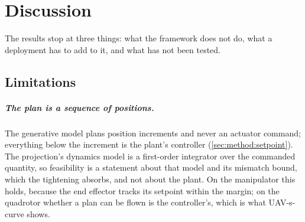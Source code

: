 
\chapter{Discussion}\label{ch:discussion}

The results stop at three things: what the framework does not do, what a deployment has to add to it,
and what has not been tested.

\section{Limitations}\label{sec:disc:limitations}

\paragraph{The plan is a sequence of positions.} The generative model plans position increments and
never an actuator command; everything below the increment is the plant's controller
(\autoref{sec:method:setpoint}). The projection's dynamics model is a first-order integrator over the
commanded quantity, so feasibility is a statement about that model and its mismatch bound, which the
tightening absorbs, and not about the plant. On the manipulator this holds, because the end effector
tracks its setpoint within the margin; on the quadrotor whether a plan can be flown is the
controller's, which is what UAV-s-curve shows.

